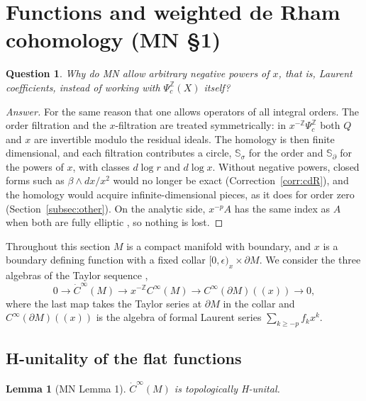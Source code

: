 \documentclass[11pt,oneside,reqno]{article}
\newcommand{\Z}{\mathbb Z}
\newcommand{\Psic}{\Psi_{c}}
\newcommand{\CI}{C^\infty}
\newcommand{\dCI}{\dot C^\infty}
\newcommand{\Ssig}{\mathbb S_\sigma}
\newcommand{\Sd}{\mathbb S_\partial}
\theoremstyle{plain}
\newtheorem{lemma}[theorem]{Lemma}
\newtheorem{question}[theorem]{Question}
\theoremstyle{definition}
\theoremstyle{remark}
\newenvironment{answer}{\begin{proof}[Answer]}{\end{proof}}
\newcommand{\Lser}[1]{(\!(#1)\!)}
\begin{document}
\section{Functions and weighted de Rham cohomology (MN \S1)}
\label{sec:functions}

\begin{question}
Why do MN allow arbitrary negative powers of \(x\), that is, Laurent
coefficients, instead of working with \(\Psic^{\Z}(X)\) itself?
\end{question}
\begin{answer}
For the same reason that one allows operators of all integral orders. The
order filtration and the \(x\)-filtration are treated symmetrically: in
\(x^{-\Z}\Psic^{\Z}\) both \(Q\) and \(x\) are invertible modulo the
residual ideals. The homology is then finite dimensional, and each
filtration contributes a circle, \(\Ssig\) for the order and \(\Sd\) for
the powers of \(x\), with classes \(d\log r\) and \(d\log x\). Without
negative powers, closed forms such as \(\beta\wedge dx/x^2\) would no longer
be exact (Correction~\ref{corr:cdR}), and the homology would acquire
infinite-dimensional pieces, as it does for order zero
(Section~\ref{subsec:other}). On the analytic side, \(x^{-p}A\) has the
same index as \(A\) when both are fully elliptic \cite[p.~31]{MN}, so
nothing is lost.
\end{answer}

Throughout this section \(M\) is a compact manifold with boundary, and
\(x\) is a boundary defining function with a fixed collar
\([0,\epsilon)_x\times\partial M\). We consider the three algebras of the
Taylor sequence \cite[(25)]{MN},
\begin{equation}\label{eq:taylorfun}
 0\to\dCI(M)\to x^{-\Z}\CI(M)\to\CI(\partial M)\Lser{x}\to0,
\end{equation}
where the last map takes the Taylor series at \(\partial M\) in the collar
and \(\CI(\partial M)\Lser{x}\) is the algebra of formal Laurent series
\(\sum_{k\ge-p}f_kx^k\).

\subsection{H-unitality of the flat functions}

\begin{lemma}[MN Lemma 1]\label{lem:flatHunital}
\(\dCI(M)\) is topologically H-unital.
\end{lemma}
\end{document}
